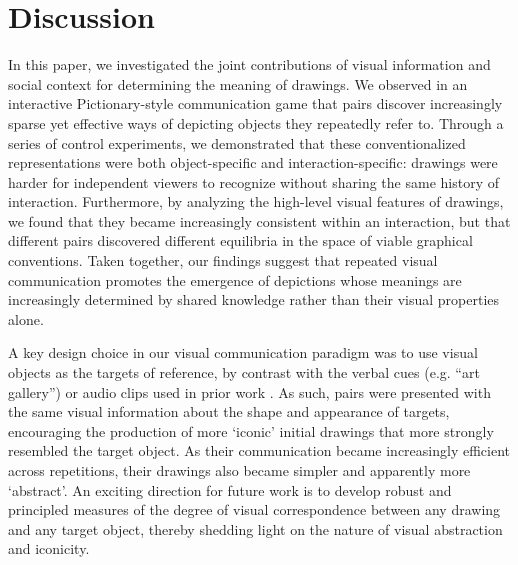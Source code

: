 \documentclass[10pt,letterpaper]{article}
\begin{document}
\section{Discussion}

In this paper, we investigated the joint contributions of visual information and social context for determining the meaning of drawings.
We observed in an interactive Pictionary-style communication game that pairs discover increasingly sparse yet effective ways of depicting objects they repeatedly refer to.
Through a series of control experiments, we demonstrated that these conventionalized representations were both object-specific and interaction-specific: drawings were harder for independent viewers to recognize without sharing the same history of interaction.
Furthermore, by analyzing the high-level visual features of drawings, we found that they became increasingly consistent within an interaction, but that different pairs discovered different equilibria in the space of viable graphical conventions.
Taken together, our findings suggest that repeated visual communication promotes the emergence of depictions whose meanings are increasingly determined by shared knowledge rather than their visual properties alone.

A key design choice in our visual communication paradigm was to use visual objects as the targets of reference, by contrast with the verbal cues (e.g. ``art gallery'') or audio clips used in prior work \cite{GalantucciGarrod11_ExperimentalSemiotics}. %
As such, pairs were presented with the same visual information about the shape and appearance of targets, encouraging the production of more `iconic' initial drawings that more strongly resembled the target object.
As their communication became increasingly efficient across repetitions, their drawings also became simpler and apparently more `abstract'.
An exciting direction for future work is to develop robust and principled measures of the degree of visual correspondence between any drawing and any target object, thereby shedding light on the nature of visual abstraction and iconicity.
\end{document}
